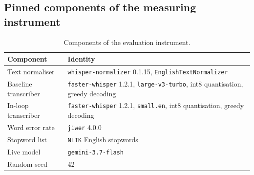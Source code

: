 \subsection{Pinned components of the measuring instrument}
\label{app:pinned}


\begin{table}[H]
  \mytable
  \begin{tabularx}{\textwidth}{@{}lL@{}}
    \toprule
    Component & Identity \\
    \midrule
    Text normaliser        & \texttt{whisper-normalizer} 0.1.15, \texttt{EnglishTextNormalizer} \cite{whisper_normalizer,radford2023whisper} \\
    Baseline transcriber   & \texttt{faster-whisper} 1.2.1, \texttt{large-v3-turbo}, int8 quantisation, greedy decoding \cite{faster_whisper,radford2023whisper,whisper_turbo} \\
    In-loop transcriber    & \texttt{faster-whisper} 1.2.1, \texttt{small.en}, int8 quantisation, greedy decoding \\
    Word error rate        & \texttt{jiwer} 4.0.0 \cite{jiwer} \\
    Stopword list          & \texttt{NLTK} English stopwords \cite{bird2009nltk} \\
    Live model             & \texttt{gemini-3.7-flash} \\
    Random seed            & 42 \\
    \bottomrule
  \end{tabularx}
  \caption{Components of the evaluation instrument.}
  \label{tab:pinned}
\end{table}
